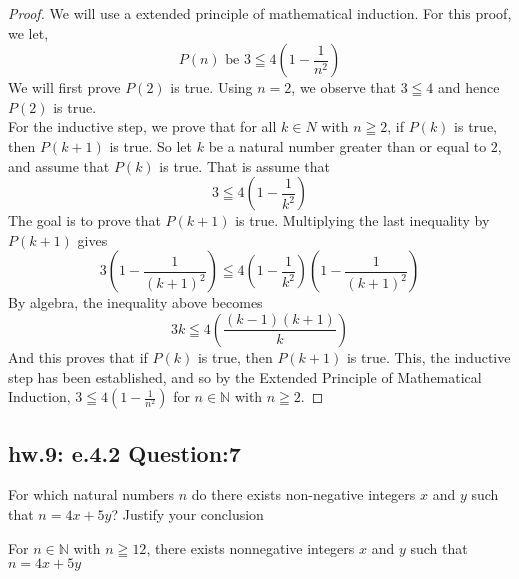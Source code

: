 \begin{proof}
    We will use a extended principle of mathematical induction. For this proof, we let,
        \begin{equation*}
            P(n) \text{ be } 3 \leqq 4(1 - \frac{1}{n^2})
        \end{equation*}
    We will first prove $P(2)$ is true. Using $n=2$, we observe that $3 \leqq 4$ and hence $P(2)$ is true. \\
    
    For the inductive step, we prove that for all $k \in N$ with $n \geqq 2$, if $P(k)$ is true, then $P(k+1)$ is true. So let $k$ be a natural number greater than or equal to $2$, and assume that $P(k)$ is true. That is assume that 
        \begin{equation*}
            3 \leqq 4(1 - \frac{1}{k^2})
        \end{equation*}
    The goal is to prove that $P(k+1)$ is true. Multiplying the last inequality by $P(k+1)$ gives 
        \begin{equation*}
            3(1 - \frac{1}{(k+1)^2}) \leqq 4(1 - \frac{1}{k^2})(1 - \frac{1}{(k+1)^2})
        \end{equation*}
    By algebra, the inequality above becomes 
     \begin{equation*}
            3k \leqq 4(\frac{(k-1)(k+1)}{k})
        \end{equation*}
And this proves that if $P(k)$ is true, then $P(k+1)$ is true. This, the inductive step has been established, and so by the Extended Principle of Mathematical Induction, $3 \leqq 4(1 - \frac{1}{n^2})$ for $n \in \mathbb{N}$ with $n \geqq 2$.
\end{proof}



\newpage
\subsection{hw.9: e.4.2 Question:7}

For which natural numbers $n$ do there exists non-negative integers $x$ and $y$ such that $n = 4x + 5y$? Justify your conclusion

\begin{tcolorbox}
    \begin{theorem}
        For $n \in \mathbb{N}$ with $n \geqq 12$, there exists nonnegative integers $x$ and $y$ such that $n = 4x + 5y$
    \end{theorem}
\end{tcolorbox}

